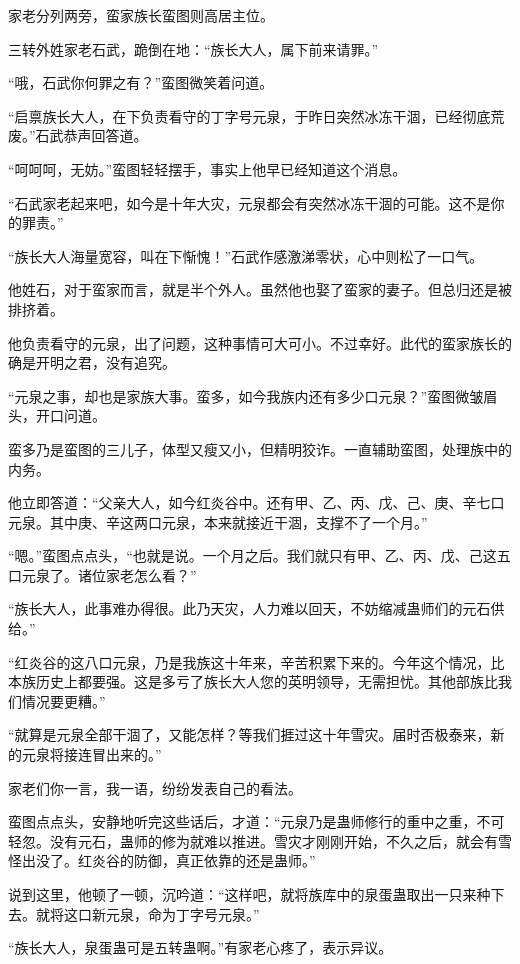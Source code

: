 \begin{this_body}
家老分列两旁，蛮家族长蛮图则高居主位。

三转外姓家老石武，跪倒在地：“族长大人，属下前来请罪。”

“哦，石武你何罪之有？”蛮图微笑着问道。

“启禀族长大人，在下负责看守的丁字号元泉，于昨日突然冰冻干涸，已经彻底荒废。”石武恭声回答道。

“呵呵呵，无妨。”蛮图轻轻摆手，事实上他早已经知道这个消息。

“石武家老起来吧，如今是十年大灾，元泉都会有突然冰冻干涸的可能。这不是你的罪责。”

“族长大人海量宽容，叫在下惭愧！”石武作感激涕零状，心中则松了一口气。

他姓石，对于蛮家而言，就是半个外人。虽然他也娶了蛮家的妻子。但总归还是被排挤着。

他负责看守的元泉，出了问题，这种事情可大可小。不过幸好。此代的蛮家族长的确是开明之君，没有追究。

“元泉之事，却也是家族大事。蛮多，如今我族内还有多少口元泉？”蛮图微皱眉头，开口问道。

蛮多乃是蛮图的三儿子，体型又瘦又小，但精明狡诈。一直辅助蛮图，处理族中的内务。

他立即答道：“父亲大人，如今红炎谷中。还有甲、乙、丙、戊、己、庚、辛七口元泉。其中庚、辛这两口元泉，本来就接近干涸，支撑不了一个月。”

“嗯。”蛮图点点头，“也就是说。一个月之后。我们就只有甲、乙、丙、戊、己这五口元泉了。诸位家老怎么看？”

“族长大人，此事难办得很。此乃天灾，人力难以回天，不妨缩减蛊师们的元石供给。”

“红炎谷的这八口元泉，乃是我族这十年来，辛苦积累下来的。今年这个情况，比本族历史上都要强。这是多亏了族长大人您的英明领导，无需担忧。其他部族比我们情况要更糟。”

“就算是元泉全部干涸了，又能怎样？等我们捱过这十年雪灾。届时否极泰来，新的元泉将接连冒出来的。”

家老们你一言，我一语，纷纷发表自己的看法。

蛮图点点头，安静地听完这些话后，才道：“元泉乃是蛊师修行的重中之重，不可轻忽。没有元石，蛊师的修为就难以推进。雪灾才刚刚开始，不久之后，就会有雪怪出没了。红炎谷的防御，真正依靠的还是蛊师。”

说到这里，他顿了一顿，沉吟道：“这样吧，就将族库中的泉蛋蛊取出一只来种下去。就将这口新元泉，命为丁字号元泉。”

“族长大人，泉蛋蛊可是五转蛊啊。”有家老心疼了，表示异议。


\end{this_body}
